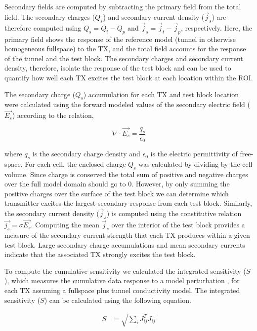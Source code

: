 \documentclass[preprint,authoryear,12pt]{elsarticle}
\begin{document}
Secondary fields are computed by subtracting the primary field from the total field. The secondary charges ($Q_s$) and secondary current density ($\vec{j}_s$) are therefore computed using $Q_s  = Q_t - Q_p$ and $\vec{j}_s  = \vec{j}_t - \vec{j}_p$, respectively. Here, the primary field shows the response of the reference model (tunnel in otherwise homogeneous fullspace) to the TX, and the total field accounts for the response of the tunnel and the test block.  The secondary charges and secondary current density, therefore, isolate the response of the test block and can be used to quantify how well each TX excites the test block at each location within the ROI.

The secondary charge ($Q_{s}$) accumulation for each TX and test block location were calculated using the forward modeled values of the secondary electric field ($\vec{E_{s}}$) according to the relation,

\begin{equation}
   \nabla \cdot \vec{E_{s}} = \frac{q_{s}}{\epsilon_0}
\label{eq:ChargeDensity}
\end{equation}

where $q_{s}$ is the secondary charge density and $\epsilon_0$ is the electric permittivity of free-space. For each cell, the enclosed charge $Q_{s}$ was calculated by dividing by the cell volume. Since charge is conserved the total sum of positive and negative charges over the full model domain should go to 0. However, by only summing the positive charges over the surface of the test block we can determine which transmitter excites the largest secondary response from each test block. Similarly, the secondary current density ($\vec{j}_s$) is computed using the constitutive relation $\vec{j_{s}} = \sigma \vec{E_{s}}$. Computing the mean $\vec{j}_s$ over the interior of the test block provides a measure of the secondary current strength that each TX produces within a given test block. Large secondary charge accumulations and mean secondary currents indicate that the associated TX strongly excites the test block.

To compute the cumulative sensitivity we calculated the integrated sensitivity ($S$), which measures the cumulative data response to a model perturbation \citep{Kaputerko2007}, for each TX assuming a fullspace plus tunnel conductivity model. The integrated sensitivity ($S$) can be calculated using the following equation.

\begin{align}
   S & = \sqrt{\sum_{i} J_{ij}^{T} J_{ij}}
\label{eqn:IntegratedSens}
\end{align}
\end{document}

